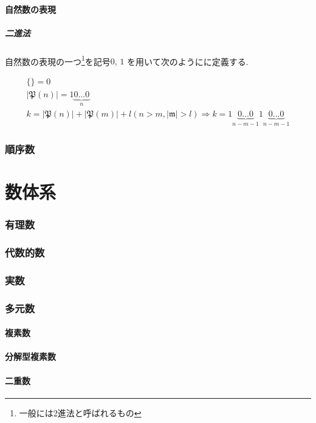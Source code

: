 \documentclass[hyperref,a4paper,12pt]{kininaruki}
\begin{document}
\subsection{自然数の表現}
\subsubsection{二進法}
自然数の表現の一つ\footnote{一般には2進法と呼ばれるもの}を記号$0,\, 1$%
を用いて次のようにに定義する.
\begin{shadebox}
    \begin{align}
        \{\} = 0\\
        |\mathfrak{P}(n)| = 1{\underbrace{0...0}_{n}}\\
        k = |\mathfrak{P}(n)| + |\mathfrak{P}(m)| + l (n>m,|\mathfrak{m}|>l)%
        \Rightarrow k = 1{\underbrace{0...0}_{n-m-1}}1{\underbrace{0...0}_{n-m-1}}
    \end{align}
\end{shadebox}
\newpage
\section{順序数}
\newpage
\part{数体系}
\section{有理数}
\newpage
\section{代数的数}
\newpage
\section{実数}
\newpage
\section{多元数}
\subsection{複素数}
\newpage
\subsection{分解型複素数}
\newpage
\subsection{二重数}
\newpage
\end{document}
